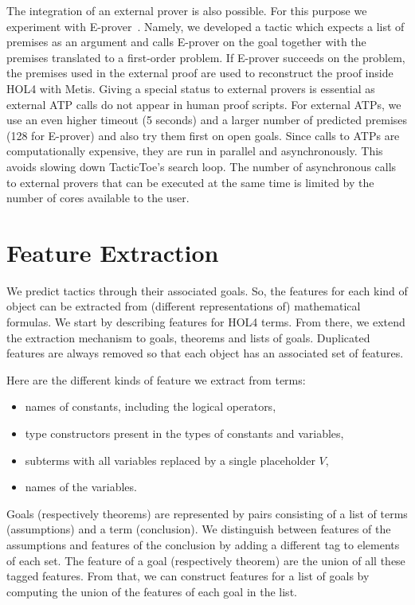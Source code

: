 \documentclass[runningheads,a4paper,draft]{svjour3}
\def\holfour{\textsf{HOL4}\xspace}
\def\eprover{\textsf{E-prover}\xspace}
\def\metis{\textsf{Metis}\xspace}
\def\tactictoe{\textsf{TacticToe}\xspace}
\begin{document}
The integration of an external prover is also possible. For this purpose we experiment
with
\eprover~\cite{eprover}.
Namely, we developed a tactic which expects a list of premises as an
argument
and calls \eprover on the goal together with the premises translated to a first-order problem. If \eprover
succeeds on the problem, the premises used in the external proof are used to
reconstruct the proof inside \holfour with \metis. Giving a special status
to external
provers is essential as external ATP calls do not appear in human
proof scripts. For external ATPs, we use an even higher timeout (5 seconds) and
a larger number of predicted premises (128 for \eprover) and also try them
first on open
goals. Since calls to ATPs are
computationally expensive, they are run in parallel and asynchronously. This
avoids slowing down \tactictoe's search loop. The number of asynchronous calls
to external provers that can be executed at the same time is limited by the
number of cores available to the user.

\section{Feature Extraction}\label{sec:features}

We predict tactics through their associated goals. So, the features
for each kind of object can be extracted from (different representations of)
mathematical formulas. We start by describing features for \holfour terms. From
there, we extend the extraction mechanism
to goals, theorems and lists of goals. Duplicated features are always removed
so that each object has an associated set of features.

Here are the different kinds of feature we extract from terms:
\begin{itemize}
\item names of constants, including the logical operators,
\item type constructors present in the types of constants and variables,
\item subterms with all variables replaced by a single placeholder $V$,
\item names of the variables.
\end{itemize}
Goals (respectively theorems) are represented by pairs consisting of a list of
terms (assumptions) and a term (conclusion). We distinguish between
features of the assumptions and features of the conclusion by adding a
different tag to elements of each set. The feature of a goal (respectively theorem)
are the union of all these tagged features. From
that, we can construct features for a list of goals by computing the union of the features of each goal in the list.
\end{document}
